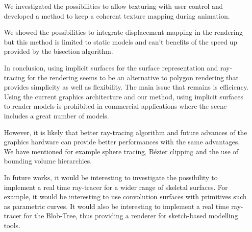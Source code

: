 \documentclass[annual]{acmsiggraph}
\begin{document}
We investigated the possibilities to allow texturing with user control and developed a method to keep a coherent texture mapping during animation.

We showed the possibilities to integrate displacement mapping in the rendering but this method is limited to static models and can't benefits of the speed up provided by the bisection algorithm. 

In conclusion, using implicit surfaces for the surface representation and ray-tracing for the rendering seems to be an alternative to polygon rendering that provides simplicity as well as flexibility. The main issue that remains is efficiency. Using the current graphics architecture and our method, using implicit surfaces to render models is prohibited in commercial applications where the scene includes a great number of models.

However, it is likely that better ray-tracing algorithm and future advances of the graphics hardware can provide better performances with the same advantages. We have mentioned for example sphere tracing, B\'ezier clipping and the use of bounding volume hierarchies.

In future works, it would be interesting to investigate the possibility to implement a real time ray-tracer for a wider range of skeletal surfaces. For example, it would be interesting to use convolution surfaces with primitives such as parametric curves. It would also be interesting to implement a real time ray-tracer for the Blob-Tree, thus providing a renderer for sketch-based modelling tools.





\end{document}
